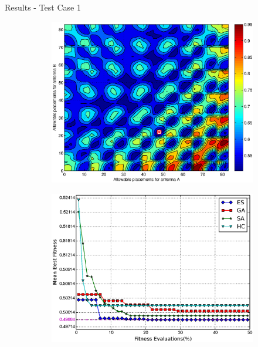 \documentclass{beamer}
\begin{document}
\begin{frame}{Results - Test Case 1}
    \begin{figure}
        \centering
        \begin{subfigure}{.5\columnwidth}
            \includegraphics[width=\columnwidth,height=\columnwidth]{../paper/FIG/tc1_contour}%
        \end{subfigure}\hfill%
        \begin{subfigure}{.5\columnwidth}
            \includegraphics[width=\columnwidth, height=\columnwidth]{../paper/FIG/tc1_mf}%
        \end{subfigure}\hfill\\%
    \end{figure}
\end{frame}
\end{document}
